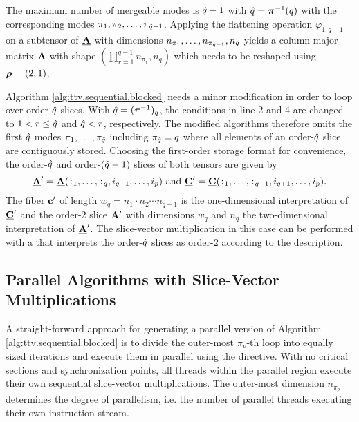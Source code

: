 The maximum number of mergeable modes is $\hat{q}-1$ with $\hat{q} = \boldsymbol{\pi}^{-1}(q)$ with the corresponding modes $\pi_1,\pi_2,\dots,\pi_{\hat{q}-1}$.
Applying the flattening operation $\varphi_{1,q-1}$ on a subtensor of $\underline{\mathbf{A}}$ with dimensions $n_{\pi_1},\dots,n_{\pi_{\hat{q}-1}}, n_{q}$ yields a column-major matrix $\mathbf{A}$ with shape $(\prod_{r=1}^{q-1} n_{\pi_r}, n_q)$ which needs to be reshaped using $\boldsymbol{\rho} = (2,1)$.


Algorithm \ref{alg:ttv.sequential.blocked} needs a minor modification in order to loop over order-$\hat{q}$ slices. 
With $\hat{q} = (\pi^{-1})_q$, the conditions in line 2 and 4 are changed to $1 < r \leq \hat{q}$ and $\hat{q} < r$, respectively.
The modified algorithms therefore omits the first $\hat{q}$ modes $\pi_1, \dots, \pi_{\hat{q}}$ including $\pi_{\hat{q}} = q$ where all elements of an order-$\hat{q}$ slice are contiguously stored.
Choosing the first-order storage format for convenience, the order-$\hat{q}$ and order-$(\hat{q}-1)$ slices of both tensors are given by 
\begin{equation}
	\label{equ:order.mhq.slice}
	\underline{\mathbf{A}}' = \underline{\mathbf{A}}(\colon_{\mkern-5.5mu1},\dots,\colon_{\mkern-5.5muq},i_{q+1},\dots,i_{p}) 
	\ \text{and} \
	\underline{\mathbf{C}}' = \underline{\mathbf{C}}(\colon_{\mkern-5.5mu1},\dots,\colon_{\mkern-5.5mu{q-1}},i_{q+1},\dots,i_p).
\end{equation}
The fiber $\mathbf{c}'$ of length $w_q = n_{1} \cdot n_2 \cdots n_{q-1}$ is the one-dimensional interpretation of $\underline{\mathbf{C}}'$ and the order-$2$ slice $\mathbf{A}'$ with dimensions $w_q$ and $n_q$ the two-dimensional interpretation of $\underline{\mathbf{A}}'$.
The slice-vector multiplication in this case can be performed with a \tf{GEMV} that interprets the order-$\hat{q}$ slices as order-$2$ according to the description.

 
\subsection{Parallel Algorithms with Slice-Vector Multiplications}
\label{subsec:parallel.multi-loops}
A straight-forward approach for generating a parallel version of Algorithm \ref{alg:ttv.sequential.blocked} is to divide the outer-most $\pi_p$-th loop into equally sized iterations and execute them in parallel using the    directive\cite{bassoy:2018:fast}.
With no critical sections and synchronization points, all threads within the parallel region execute their own sequential slice-vector multiplications.
The outer-most dimension $n_{\pi_p}$ determines the degree of parallelism, i.e. the number of parallel threads executing their own instruction stream.


